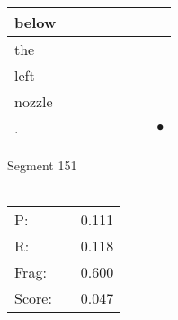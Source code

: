 \documentclass[landscape]{article}
\newcommand{\ssp}{\hspace{2pt}}
\newcommand{\mex}{\cellcolor{g}$\bullet$}
\begin{document}
\begin{tabular}{|l|p{10pt}|p{10pt}|p{10pt}|p{10pt}|p{10pt}|p{10pt}|p{10pt}|}
\hline
\ssp below \ssp&\hspace{2pt}&\hspace{2pt}&\hspace{2pt}&\hspace{2pt}&\hspace{2pt}&\hspace{2pt}&\hspace{2pt}\\
\hline
\ssp the \ssp&\hspace{2pt}&\hspace{2pt}&\hspace{2pt}&\hspace{2pt}&\hspace{2pt}&\hspace{2pt}&\hspace{2pt}\\
\hline
\ssp left \ssp&\hspace{2pt}&\hspace{2pt}&\hspace{2pt}&\hspace{2pt}&\hspace{2pt}&\hspace{2pt}&\hspace{2pt}\\
\hline
\ssp nozzle \ssp&\hspace{2pt}&\hspace{2pt}&\hspace{2pt}&\hspace{2pt}&\hspace{2pt}&\hspace{2pt}&\hspace{2pt}\\
\hline
\ssp \cellcolor{ref6}. \ssp&\hspace{2pt}&\hspace{2pt}&\hspace{2pt}&\hspace{2pt}&\hspace{2pt}&\hspace{2pt}&\hspace{2pt}\mex\\
\hline
\end{tabular}

\vspace{6pt}
\noindent Segment 151\\\\
\noindent\begin{tabular}{lm{12pt}r}
\hline
P:&&0.111\\
R:&&0.118\\
Frag:&&0.600\\
Score:&&0.047\\
\end{tabular}
\end{document}
